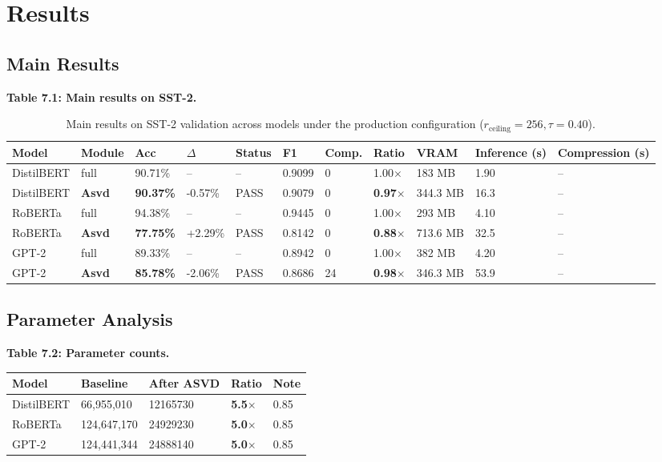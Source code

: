 
\section{Results}

\subsection{Main Results}

\textbf{Table 7.1: Main results on SST-2.}

\begin{table}[t]
\centering
\small
\begin{tabular}{lllllllllll}
\toprule
\textbf{Model} & \textbf{Module} & \textbf{Acc} & \textbf{$\Delta$} & \textbf{Status} & \textbf{F1} & \textbf{Comp.} & \textbf{Ratio} & \textbf{VRAM} & \textbf{Inference (s)} & \textbf{Compression (s)} \\
\midrule
DistilBERT & full & 90.71\% & -- & -- & 0.9099 & 0 & 1.00$\times$ & 183 MB & 1.90 & -- \\
DistilBERT & \textbf{Asvd} & \textbf{90.37\%} & -0.57\% & PASS & 0.9079 & 0 & \textbf{0.97$\times$} & 344.3 MB & 16.3 & -- \\
RoBERTa & full & 94.38\% & -- & -- & 0.9445 & 0 & 1.00$\times$ & 293 MB & 4.10 & -- \\
RoBERTa & \textbf{Asvd} & \textbf{77.75\%} & +2.29\% & PASS & 0.8142 & 0 & \textbf{0.88$\times$} & 713.6 MB & 32.5 & -- \\
GPT-2 & full & 89.33\% & -- & -- & 0.8942 & 0 & 1.00$\times$ & 382 MB & 4.20 & -- \\
GPT-2 & \textbf{Asvd} & \textbf{85.78\%} & -2.06\% & PASS & 0.8686 & 24 & \textbf{0.98$\times$} & 346.3 MB & 53.9 & -- \\
\bottomrule
\end{tabular}
\caption{Main results on SST-2 validation across models under the production configuration ($r_{\mathrm{ceiling}}=256, \tau=0.40$).}
\label{tab:main_sst2}
\end{table}

\subsection{Parameter Analysis}

\textbf{Table 7.2: Parameter counts.}

\begin{table}[H]
\centering
\small
\begin{tabular}{lllll}
\toprule
\textbf{Model} & \textbf{Baseline} & \textbf{After ASVD} & \textbf{Ratio} & \textbf{Note} \\
\midrule
DistilBERT & 66,955,010 & 12165730 & \textbf{5.5$\times$} & 0.85 \\
RoBERTa & 124,647,170 & 24929230 & \textbf{5.0$\times$} & 0.85 \\
GPT-2 & 124,441,344 & 24888140 & \textbf{5.0$\times$} & 0.85 \\
\bottomrule
\end{tabular}
\end{table}

